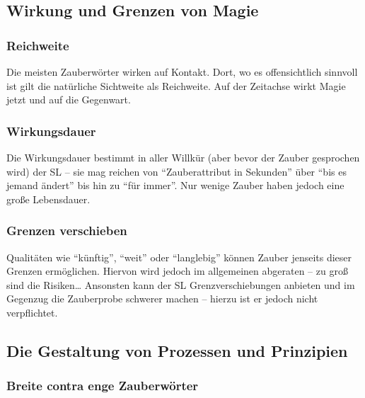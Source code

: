 \subsection{Wirkung und Grenzen von Magie}
\subsubsection{Reichweite}

Die meisten Zauberwörter wirken auf Kontakt. Dort, wo es offensichtlich sinnvoll ist gilt die natürliche Sichtweite als Reichweite. Auf der Zeitachse wirkt Magie jetzt und auf die Gegenwart.

\subsubsection{Wirkungsdauer}

Die Wirkungsdauer bestimmt in aller Willkür (aber bevor der Zauber gesprochen wird) der SL -- sie mag reichen von "`Zauberattribut in Sekunden"' über "`bis es jemand ändert"' bis hin zu "`für immer"'. Nur wenige Zauber haben jedoch eine große Lebensdauer.

\subsubsection{Grenzen verschieben}

Qualitäten wie "`künftig"', "`weit"' oder "`langlebig"' können Zauber jenseits dieser Grenzen ermöglichen. Hiervon wird jedoch im allgemeinen abgeraten -- zu groß sind die Risiken\dots
Ansonsten kann der SL Grenzverschiebungen anbieten und im Gegenzug die Zauberprobe schwerer machen -- hierzu ist er jedoch nicht verpflichtet.


\subsection{Die Gestaltung von Prozessen und Prinzipien}

\subsubsection{Breite contra enge Zauberwörter}

